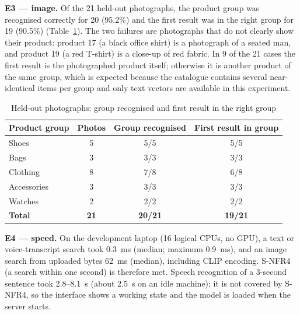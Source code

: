\textbf{E3 --- image.} Of the 21 held-out photographs, the product group was recognised correctly for 20 (95.2\%) and the first result was in the right group for 19 (90.5\%) (Table~\ref{tab:imageheld}). The two failures are photographs that do not clearly show their product: product 17 (a black office shirt) is a photograph of a seated man, and product 19 (a red T-shirt) is a close-up of red fabric. In 9 of the 21 cases the first result is the photographed product itself; otherwise it is another product of the same group, which is expected because the catalogue contains several near-identical items per group and only text vectors are available in this experiment.

\begin{table}[H]
\centering
\small
\caption{Held-out photographs: group recognised and first result in the right group}
\label{tab:imageheld}
\begin{tabular}{@{}lccc@{}}
\toprule
\textbf{Product group} & \textbf{Photos} & \textbf{Group recognised} & \textbf{First result in group} \\ \midrule
Shoes & 5 & 5/5 & 5/5 \\
Bags & 3 & 3/3 & 3/3 \\
Clothing & 8 & 7/8 & 6/8 \\
Accessories & 3 & 3/3 & 3/3 \\
Watches & 2 & 2/2 & 2/2 \\ \midrule
\textbf{Total} & \textbf{21} & \textbf{20/21} & \textbf{19/21} \\ \bottomrule
\end{tabular}
\end{table}

\textbf{E4 --- speed.} On the development laptop (16 logical CPUs, no GPU), a text or voice-transcript search took 0.3~ms (median; maximum 0.9~ms), and an image search from uploaded bytes 62~ms (median), including CLIP encoding. S-NFR4 (a search within one second) is therefore met. Speech recognition of a 3-second sentence took 2.8--8.1~s (about 2.5~s on an idle machine); it is not covered by S-NFR4, so the interface shows a working state and the model is loaded when the server starts.

